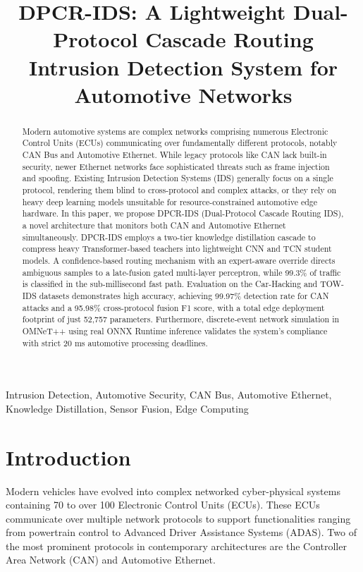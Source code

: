 \documentclass[conference]{IEEEtran}
\begin{document}
\title{DPCR-IDS: A Lightweight Dual-Protocol Cascade Routing Intrusion Detection System for Automotive Networks}

\author{
}

\maketitle

\begin{abstract}
Modern automotive systems are complex networks comprising numerous Electronic Control Units (ECUs) communicating over fundamentally different protocols, notably CAN Bus and Automotive Ethernet. While legacy protocols like CAN lack built-in security, newer Ethernet networks face sophisticated threats such as frame injection and spoofing. Existing Intrusion Detection Systems (IDS) generally focus on a single protocol, rendering them blind to cross-protocol and complex attacks, or they rely on heavy deep learning models unsuitable for resource-constrained automotive edge hardware. In this paper, we propose DPCR-IDS (Dual-Protocol Cascade Routing IDS), a novel architecture that monitors both CAN and Automotive Ethernet simultaneously. DPCR-IDS employs a two-tier knowledge distillation cascade to compress heavy Transformer-based teachers into lightweight CNN and TCN student models. A confidence-based routing mechanism with an expert-aware override directs ambiguous samples to a late-fusion gated multi-layer perceptron, while 99.3\% of traffic is classified in the sub-millisecond fast path. Evaluation on the Car-Hacking and TOW-IDS datasets demonstrates high accuracy, achieving 99.97\% detection rate for CAN attacks and a 95.98\% cross-protocol fusion F1 score, with a total edge deployment footprint of just 52,757 parameters. Furthermore, discrete-event network simulation in OMNeT++ using real ONNX Runtime inference validates the system's compliance with strict 20 ms automotive processing deadlines.
\end{abstract}

\begin{IEEEkeywords}
Intrusion Detection, Automotive Security, CAN Bus, Automotive Ethernet, Knowledge Distillation, Sensor Fusion, Edge Computing
\end{IEEEkeywords}

\section{Introduction}
Modern vehicles have evolved into complex networked cyber-physical systems containing 70 to over 100 Electronic Control Units (ECUs). These ECUs communicate over multiple network protocols to support functionalities ranging from powertrain control to Advanced Driver Assistance Systems (ADAS). Two of the most prominent protocols in contemporary architectures are the Controller Area Network (CAN) and Automotive Ethernet.
\end{document}
